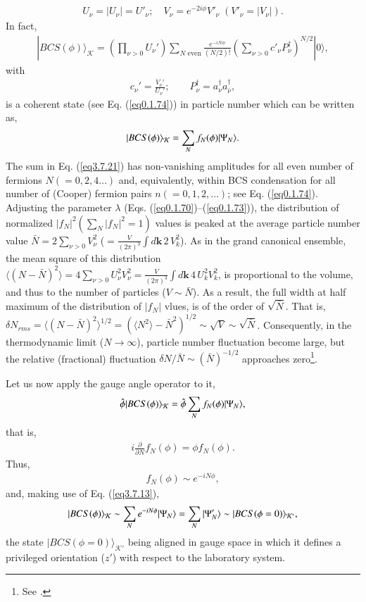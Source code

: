 \begin{align}
U_\nu=|U_\nu|=U'_\nu;\quad V_\nu=e^{-2i\phi}V'_\nu \;(V'_\nu=|V_\nu|).
\end{align}
In fact, 
\begin{align}\label{eq3.7.19}
|BCS(\phi)\rangle_{\mathcal{K}}=\left(\prod_{\nu>0}U_\nu'\right)\sum_{N\text{ even}}\frac{e^{-iN\phi}}{(N/2)!}\left(\sum_{\nu>0}c'_\nu P^\dagger_\nu\right)^{N/2}|0\rangle,
\end{align}
with
\begin{align}
c_\nu'=\frac{V_\nu'}{U_\nu'};\quad \quad P^\dagger_\nu=a^\dagger_\nu a^\dagger_{\bar\nu},
\end{align}
is a coherent state (see Eq. (\ref{eq0.1.74})) in particle number which can be written as,
\begin{align}\label{eq3.7.21}
|{BCS(\phi)} \rangle_{\mathcal K}=\sum_N f_N(\phi)|{\Psi_N} \rangle.
\end{align}
The sum in Eq. (\ref{eq3.7.21}) has non-vanishing amplitudes for all even number of fermions $N(=0,2,4\dots)$ and, equivalently, within BCS condensation for all number of (Cooper) fermion pairs $n(=0,1,2,\dots)$; see Eq. (\ref{eq0.1.74}). Adjusting the parameter $\lambda$ (Eqs. (\ref{eq0.1.70})--(\ref{eq0.1.73})), the distribution of normalized $|f_N|^2(\sum_N |f_N|^2=1)$ values is peaked at the average particle number value $\bar N=2\sum_{\nu>0}V_\nu^2$ ($=\tfrac{V}{(2\pi)^3}$$\int d\mathbf k\,2\,V^2_k$). As in the grand canonical ensemble, the mean square of this distribution $\langle(N-\bar N)^2\rangle=4\sum_{\nu>0}U_\nu^2V_\nu^2=\tfrac{V}{(2\pi)^3}\int d\mathbf k\,4\,U^2_kV^2_k$,  is proportional to the volume, and thus to the number of particles ($V\sim \bar N$). As a result, the full width at half maximum of the distribution of $|f_N|$ vlues, is of the order of $\sqrt{\bar N}$. That is, $\delta N_{rms}=\langle(N-\bar N)^2\rangle^{1/2}=(\langle N^2\rangle-\bar N^2)^{1/2}\sim\sqrt{V}\sim\sqrt{\bar N}$. Consequently, in the thermodynamic limit ($N\to\infty$), particle number fluctuation become large, but the relative (fractional) fluctuation $\delta N/\bar N\sim(\bar N)^{-1/2}$ approaches zero\footnote{See \cite{Schrieffer:64,Tinkham:96,DeGennes:66}.}.



Let us now apply the gauge angle operator to it,
\begin{align}
\hat{\phi}|{BCS(\phi)} \rangle_{\mathcal K}=\hat{\phi}\sum_{N}f_N(\phi)|{\Psi_N} \rangle,
\end{align}
that is,
\begin{align}
i\frac{\partial}{\partial N}f_N(\phi)=\phi f_N(\phi).
\end{align}
Thus,
\begin{align}
f_N(\phi)\sim e^{-iN\phi},
\end{align}
and, making use of Eq. (\ref{eq3.7.13}),
\begin{align}\label{eq4.7.25}
|{BCS(\phi)} \rangle_{\mathcal K}\sim \sum_{N} e^{-iN\phi}|{\Psi_N} \rangle=\sum_N |{\Psi'_{N}} \rangle\sim|{BCS(\phi=0)} \rangle_{\mathcal K'},
\end{align}
 the state $|BCS(\phi=0)\rangle_{\mathcal{K}'}$ being aligned in gauge space in which it defines a privileged orientation ($z'$) with respect to the laboratory system.


